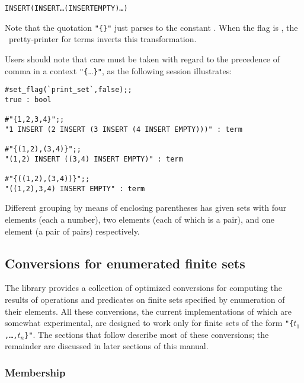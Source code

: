 \begin{hol}\begin{alltt}
   INSERT  (INSERT  \dots (INSERT  EMPTY)\dots)
\end{alltt}\end{hol}

\noindent Note that the quotation {\small\verb!"{}"!} just parses to the
constant . When the
flag is , the \HOL\ pretty-printer for terms inverts this
transformation.

Users should note that care must be taken with regard to the precedence of
comma in a context {\small\verb!"{!\dots\verb!}"!}, as the following session
illustrates:

\setcounter{sessioncount}{1}
\begin{session}\begin{verbatim}
#set_flag(`print_set`,false);;
true : bool

#"{1,2,3,4}";;
"1 INSERT (2 INSERT (3 INSERT (4 INSERT EMPTY)))" : term

#"{(1,2),(3,4)}";;
"(1,2) INSERT ((3,4) INSERT EMPTY)" : term

#"{((1,2),(3,4))}";;
"((1,2),3,4) INSERT EMPTY" : term
\end{verbatim}\end{session}

\noindent Different grouping by means of enclosing parentheses has given sets
with four elements (each a number), two elements (each of which is a pair), and
one element (a pair of pairs) respectively.

\subsection{Conversions for enumerated finite sets}

The  library provides a collection of optimized conversions for
computing the results of operations and predicates on finite sets specified by
enumeration of their elements.  All these conversions, the current
implementations of which are somewhat experimental, are designed to work only
for finite sets of the form {\small\verb!"{!\tt$t_1$,\dots,$t_n$\verb!}"!}.
The sections that follow describe most of these conversions; the remainder are
discussed in later sections of this manual.

\subsubsection{Membership}\label{inconv}

